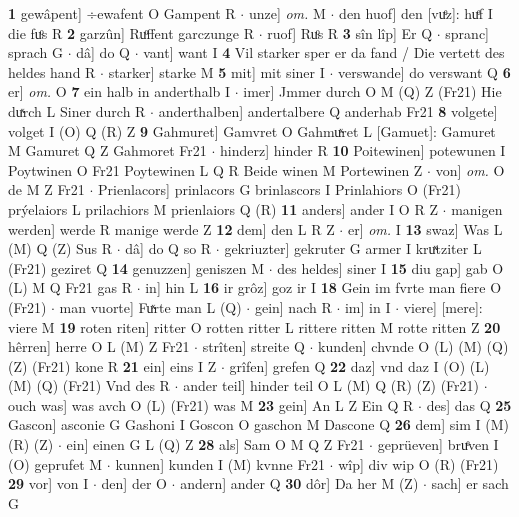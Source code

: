 \documentclass[8pt,a4paper,notitlepage]{article}
\begin{document}
\begin{table}[ht]
\begin{minipage}[t]{0.5\linewidth}
\textbf{1} gewâpent] ÷ewafent O Gampent R  $\cdot$ unze] \textit{om.} M  $\cdot$ den huof] den [vuͤz]: huͤf I die fuͦs R \textbf{2} garzûn] Ruͦffent garczunge R  $\cdot$ ruof] Ruͦs R \textbf{3} sîn lîp] Er Q  $\cdot$ spranc] sprach G  $\cdot$ dâ] do Q  $\cdot$ vant] want I \textbf{4} Vil starker sper er da fand / Die vertett des heldes hand R  $\cdot$ starker] starke M \textbf{5} mit] mit siner I  $\cdot$ verswande] do verswant Q \textbf{6} er] \textit{om.} O \textbf{7} ein halb in anderthalb I  $\cdot$ imer] Jmmer durch O M (Q) Z (Fr21) Hie duͯrch L Siner durch R  $\cdot$ anderthalben] andertalbere Q anderhab Fr21 \textbf{8} volgete] volget I (O) Q (R) Z \textbf{9} Gahmuret] Gamvret O Gahmuͯret L [Gamuet]: Gamuret M Gamuret Q Z Gahmoret Fr21  $\cdot$ hinderz] hinder R \textbf{10} Poitewinen] potewunen I Poytwinen O Fr21 Poytewinen L Q R Beide winen M Portewinen Z  $\cdot$ von] \textit{om.} O de M Z Fr21  $\cdot$ Prienlacors] prinlacors G brinlascors I Prinlahiors O (Fr21) prýelaiors L prilachiors M prienlaiors Q (R) \textbf{11} anders] ander I O R Z  $\cdot$ manigen werden] werde R manige werde Z \textbf{12} dem] den L R Z  $\cdot$ er] \textit{om.} I \textbf{13} swaz] Was L (M) Q (Z) Sus R  $\cdot$ dâ] do Q so R  $\cdot$ gekriuzter] gekruter G armer I kruͯtziter L (Fr21) geziret Q \textbf{14} genuzzen] geniszen M  $\cdot$ des heldes] siner I \textbf{15} diu gap] gab O (L) M Q Fr21 gas R  $\cdot$ in] hin L \textbf{16} ir grôz] goz ir I \textbf{18} Gein im fvrte man fiere O (Fr21)  $\cdot$ man vuorte] Fuͯrte man L (Q)  $\cdot$ gein] nach R  $\cdot$ im] in I  $\cdot$ viere] [mere]: viere M \textbf{19} roten riten] ritter O rotten ritter L rittere ritten M rotte ritten Z \textbf{20} hêrren] herre O L (M) Z Fr21  $\cdot$ strîten] streite Q  $\cdot$ kunden] chvnde O (L) (M) (Q) (Z) (Fr21) kone R \textbf{21} ein] eins I Z  $\cdot$ grîfen] grefen Q \textbf{22} daz] vnd daz I (O) (L) (M) (Q) (Fr21) Vnd des R  $\cdot$ ander teil] hinder teil O L (M) Q (R) (Z) (Fr21)  $\cdot$ ouch was] was avch O (L) (Fr21) was M \textbf{23} gein] An L Z Ein Q R  $\cdot$ des] das Q \textbf{25} Gascon] asconie G Gashoni I Goscon O gaschon M Dascone Q \textbf{26} dem] sim I (M) (R) (Z)  $\cdot$ ein] einen G L (Q) Z \textbf{28} als] Sam O M Q Z Fr21  $\cdot$ geprüeven] bruͤven I (O) geprufet M  $\cdot$ kunnen] kunden I (M) kvnne Fr21  $\cdot$ wîp] div wip O (R) (Fr21) \textbf{29} vor] von I  $\cdot$ den] der O  $\cdot$ andern] ander Q \textbf{30} dôr] Da her M (Z)  $\cdot$ sach] er sach G \newline
\end{minipage}

\end{table}
\end{document}
